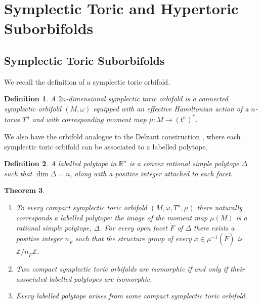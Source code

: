 \documentclass{amsart}
\newtheorem{theorem}{Theorem}[section]
\newtheorem{definition}[theorem]{Definition}
\newcommand{\ra}{\rightarrow}
\newcommand{\w}{\omega}
\newcommand{\RR}{\mathbb{R}}
\newcommand{\ZZ}{\mathbb{Z}}
\newcommand{\mft}{\mathfrak{t}}
\newcommand{\open}[1]{\mathring{#1}}
\begin{document}
	\section{Symplectic Toric and Hypertoric Suborbifolds}
	
	\subsection{Symplectic Toric Suborbifolds}
	
	We recall the definition of a symplectic toric orbifold.
	
	\begin{definition}{\cite{Aud04,Lerman1997}}
		A $2n$-dimensional \emph{symplectic toric orbifold} is a connected symplectic orbifold $(M, \w)$ equipped with an effective Hamiltonian action of a $n$-torus $T^{n}$ and with corresponding moment map $\mu : M \ra (\mft^{n})^{\ast}$.
	\end{definition}

	We also have the orbifold analogue to the Delzant construction \cite{Del88}, where each symplectic toric orbifold can be associated to a labelled polytope.
	
	\begin{definition}{\cite{Lerman1997}}
		A \emph{labelled polytope} in $\RR^{n}$ is a convex rational simple polytope $\Delta$ such that $\dim\Delta = n$, along with a positive integer attached to each facet.
	\end{definition}

	\begin{theorem}{\cite{Lerman1997}}
		\begin{enumerate}\label{thm:orbifold-characterisation}
			\item To every compact symplectic toric orbifold $(M, \w, T^{n}, \mu)$ there naturally corresponds a labelled polytope: the image of the moment map $\mu(M)$ is a rational simple polytope, $\Delta$. For every open facet $\open{F}$ of $\Delta$ there exists a positive integer $n_{\open{F}}$ such that the structure group of every $x \in \mu^{-1}(\open{F})$ is $\ZZ/n_{\open{F}}\ZZ$.
			\item Two compact symplectic toric orbifolds are isomorphic if and only if their associated labelled polytopes are isomorphic.
			\item Every labelled polytope arises from some compact symplectic toric orbifold.
		\end{enumerate}
	\end{theorem}
\end{document}
